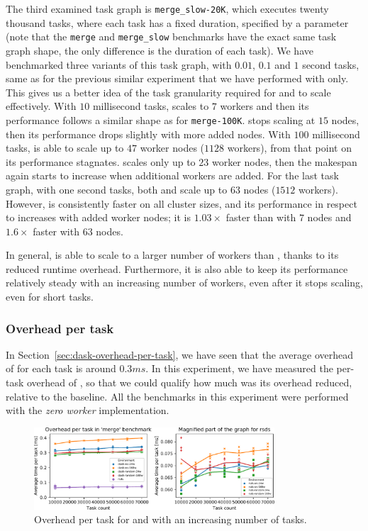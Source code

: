 The third examined task graph is \texttt{merge\_slow-20K}, which executes twenty thousand tasks,
where each task has a fixed duration, specified by a parameter (note that the
\texttt{merge} and \texttt{merge\_slow} benchmarks have the exact same task
graph shape, the only difference is the duration of each task). We have benchmarked three variants
of this task graph, with $0.01$, $0.1$ and
$1$ second tasks, same as for the previous similar experiment that we have
performed with \dask{} only. This gives us a better idea of the task
granularity required for \dask{} and \rsds{} to scale
effectively. With $10$ millisecond tasks, \dask{} scales
to $7$ workers and then its performance follows a similar shape as for
\texttt{merge-100K}. \rsds{} stops scaling at
$15$ nodes, then its performance drops slightly with more added nodes. With
$100$ millisecond tasks, \rsds{} is able to scale up to
$47$ worker nodes ($1128$ workers), from that point on
its performance stagnates. \dask{} scales only up to $23$
worker nodes, then the makespan again starts to increase when additional workers are added. For the
last task graph, with one second tasks, both \rsds{} and
\dask{} scale up to $63$ nodes
($1512$ workers). However, \rsds{} is consistently faster
on all cluster sizes, and its performance in respect to \dask{} increases with
added worker nodes; it is $1.03\times$ faster than \dask{} with
$7$ nodes and $1.6\times$ faster with
$63$ nodes.

In general, \rsds{} is able to scale to a larger number of workers than
\dask{}, thanks to its reduced runtime overhead. Furthermore, it is also able
to keep its performance relatively steady with an increasing number of workers, even after it stops
scaling, even for short tasks.

\subsubsection*{Overhead per task}
In Section~\ref{sec:dask-overhead-per-task}, we have seen that the average overhead of
\dask{} for each task is around $0.3ms$. In this experiment,
we have measured the per-task overhead of \rsds{}, so that we could qualify how
much was its overhead reduced, relative to the baseline. All the benchmarks in this experiment were
performed with the \emph{zero worker} implementation.

\begin{figure}
	\centering
	\includegraphics[width=0.8\textwidth]{./imgs/rsds/charts/rsds-merge-task-scaling}
	\caption{Overhead per task for \rsds{} and \dask{} with an increasing
	number of tasks.}
	\label{fig:rsds-merge-task-scaling}
\end{figure}

